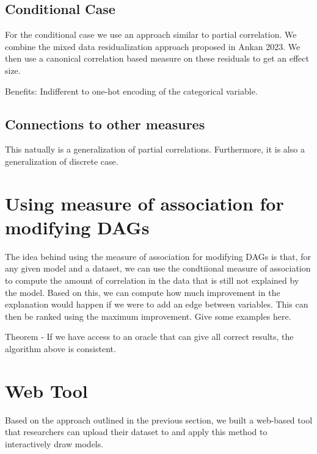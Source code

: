 \documentclass[letterpaper]{article} %
\begin{document}
\subsection{Conditional Case}
For the conditional case we use an approach similar to partial correlation. We
combine the mixed data residualization approach proposed in Ankan 2023. We then
use a canonical correlation based measure on these residuals to get an effect
size. 

Benefits: Indifferent to one-hot encoding of the categorical variable.

\subsection{Connections to other measures}
This natually is a generalization of partial correlations. Furthermore, it is 
also a generalization of discrete case.

\section{Using measure of association for modifying DAGs}
The idea behind using the measure of association for modifying DAGs is that,
for any given model and a dataset, we can use the condtiional measure of
association to compute the amount of correlation in the data that is still not
explained by the model. Based on this, we can compute how much improvement in
the explanation would happen if we were to add an edge between variables. This
can then be ranked using the maximum improvement. Give some examples here.

Theorem - If we have access to an oracle that can give all correct results, 
the algorithm above is consistent.

\section{Web Tool}
Based on the approach outlined in the previous section, we built a web-based
tool that researchers can upload their dataset to and apply this method to
interactively draw models.


\end{document}
